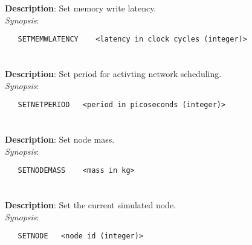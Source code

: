\section{\quad{}}
\label{manpages:SETMEMWLATENCY}
\label{manpages:setmemwlatency}
\vspace{-0.1in}
{\bf Description}: 	Set memory write latency.\\[1.5ex]
{\em Synopsis}:
\vspace{-0.05in}
\scriptsize
\begin{lstlisting}
   SETMEMWLATENCY    <latency in clock cycles (integer)>																		
\end{lstlisting}
\normalsize
\vspace{-0.05in}


\section{\quad{}}
\label{manpages:SETNETPERIOD}
\label{manpages:setnetperiod}
\vspace{-0.1in}
{\bf Description}: 	Set period for activting network scheduling.\\[1.5ex]
{\em Synopsis}:
\vspace{-0.05in}
\scriptsize
\begin{lstlisting}
   SETNETPERIOD   <period in picoseconds (integer)>																
\end{lstlisting}
\normalsize
\vspace{-0.05in}


\section{\quad{}}
\label{manpages:SETNODEMASS}
\label{manpages:setnodemass}
\vspace{-0.1in}
{\bf Description}: 	Set node mass.\\[1.5ex]
{\em Synopsis}:
\vspace{-0.05in}
\scriptsize
\begin{lstlisting}
   SETNODEMASS    <mass in kg>																						
\end{lstlisting}
\normalsize
\vspace{-0.05in}


\section{\quad{}}
\label{manpages:SETNODE}
\label{manpages:setnode}
\vspace{-0.1in}
{\bf Description}: 	Set the current simulated node.\\[1.5ex]
{\em Synopsis}:
\vspace{-0.05in}
\scriptsize
\begin{lstlisting}
   SETNODE   <node id (integer)>								
\end{lstlisting}
\normalsize
\vspace{-0.05in}



